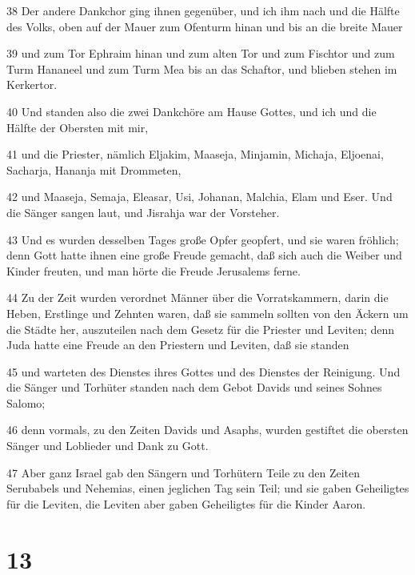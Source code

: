 \par 38 Der andere Dankchor ging ihnen gegenüber, und ich ihm nach und die Hälfte des Volks, oben auf der Mauer zum Ofenturm hinan und bis an die breite Mauer
\par 39 und zum Tor Ephraim hinan und zum alten Tor und zum Fischtor und zum Turm Hananeel und zum Turm Mea bis an das Schaftor, und blieben stehen im Kerkertor.
\par 40 Und standen also die zwei Dankchöre am Hause Gottes, und ich und die Hälfte der Obersten mit mir,
\par 41 und die Priester, nämlich Eljakim, Maaseja, Minjamin, Michaja, Eljoenai, Sacharja, Hananja mit Drommeten,
\par 42 und Maaseja, Semaja, Eleasar, Usi, Johanan, Malchia, Elam und Eser. Und die Sänger sangen laut, und Jisrahja war der Vorsteher.
\par 43 Und es wurden desselben Tages große Opfer geopfert, und sie waren fröhlich; denn Gott hatte ihnen eine große Freude gemacht, daß sich auch die Weiber und Kinder freuten, und man hörte die Freude Jerusalems ferne.
\par 44 Zu der Zeit wurden verordnet Männer über die Vorratskammern, darin die Heben, Erstlinge und Zehnten waren, daß sie sammeln sollten von den Äckern um die Städte her, auszuteilen nach dem Gesetz für die Priester und Leviten; denn Juda hatte eine Freude an den Priestern und Leviten, daß sie standen
\par 45 und warteten des Dienstes ihres Gottes und des Dienstes der Reinigung. Und die Sänger und Torhüter standen nach dem Gebot Davids und seines Sohnes Salomo;
\par 46 denn vormals, zu den Zeiten Davids und Asaphs, wurden gestiftet die obersten Sänger und Loblieder und Dank zu Gott.
\par 47 Aber ganz Israel gab den Sängern und Torhütern Teile zu den Zeiten Serubabels und Nehemias, einen jeglichen Tag sein Teil; und sie gaben Geheiligtes für die Leviten, die Leviten aber gaben Geheiligtes für die Kinder Aaron.

\chapter{13}

